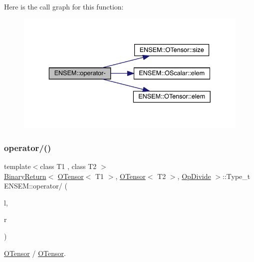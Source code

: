 Here is the call graph for this function\+:\nopagebreak
\begin{figure}[H]
\begin{center}
\leavevmode
\includegraphics[width=336pt]{de/d87/group__obstensor_gadc53621528bc3dd8257b504bff4ec21e_cgraph}
\end{center}
\end{figure}
\mbox{\label{group__obstensor_gab78687abe74ea9ae63cc1a98de644b13}} 
\subsubsection{\texorpdfstring{operator/()}{operator/()}\hspace{0.1cm}{\footnotesize\ttfamily [1/3]}}
{\footnotesize\ttfamily template$<$class T1 , class T2 $>$ \\
\mbox{\hyperlink{structENSEM_1_1BinaryReturn}{Binary\+Return}}$<$ \mbox{\hyperlink{classENSEM_1_1OTensor}{O\+Tensor}}$<$ T1 $>$, \mbox{\hyperlink{classENSEM_1_1OTensor}{O\+Tensor}}$<$ T2 $>$, \mbox{\hyperlink{structENSEM_1_1OpDivide}{Op\+Divide}} $>$\+::Type\+\_\+t E\+N\+S\+E\+M\+::operator/ (\begin{DoxyParamCaption}\item[{const \mbox{\hyperlink{classENSEM_1_1OTensor}{O\+Tensor}}$<$ T1 $>$ \&}]{l,  }\item[{const \mbox{\hyperlink{classENSEM_1_1OTensor}{O\+Tensor}}$<$ T2 $>$ \&}]{r }\end{DoxyParamCaption})\hspace{0.3cm}{\ttfamily [inline]}}



\mbox{\hyperlink{classENSEM_1_1OTensor}{O\+Tensor}} / \mbox{\hyperlink{classENSEM_1_1OTensor}{O\+Tensor}}. 

